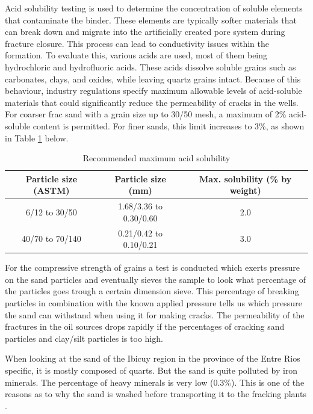 Acid solubility testing is used to determine the concentration of soluble elements that contaminate the binder. These elements are typically softer materials that can break down and migrate into the artificially created pore system during fracture closure. This process can lead to conductivity issues within the formation.
To evaluate this, various acids are used, most of them being hydrochloric and hydrofluoric acids. These acids dissolve soluble grains such as carbonates, clays, and oxides, while leaving quartz grains intact. Because of this behaviour, industry regulations specify maximum allowable levels of acid-soluble materials that could significantly reduce the permeability of cracks in the wells.
For coarser frac sand with a grain size up to 30/50 mesh, a maximum of 2\% acid-soluble content is permitted. For finer sands, this limit increases to 3\%, as shown in Table \ref{tab:acid} below.

\begin{table}[H]
\centering
\caption{Recommended maximum acid solubility \autocite{secretariadepoliticamineraArenasParaFracking2019}}
\begin{tabular}{ccc}
\hline
Particle size (ASTM) & Particle size (mm) & Max. solubility (\% by weight) \\ \hline
6/12 to 30/50 & 1.68/3.36 to 0.30/0.60 & 2.0 \\
40/70 to 70/140 & 0.21/0.42 to 0.10/0.21 & 3.0 \\
\hline
\end{tabular}
\label{tab:acid}
\end{table}

For the compressive strength of grains a test is conducted which exerts pressure on the sand particles and eventually sieves the sample to look what percentage of the particles goes trough a certain dimension sieve. This percentage of breaking particles in combination with the known applied pressure tells us which pressure the sand can withstand when using it for making cracks.
The permeability of the fractures in the oil sources drops rapidly if the percentages of cracking sand particles and clay/silt particles is too high. 

When looking at the sand of the Ibicuy region in the province of the Entre Rios specific, it is mostly composed of quarts. But the sand is quite polluted by iron minerals. The percentage of heavy minerals is very low (0.3\%). This is one of the reasons as to why the sand is washed before transporting it to the fracking plants \autocite{secretariadepoliticamineraArenasParaFracking2019}. 

